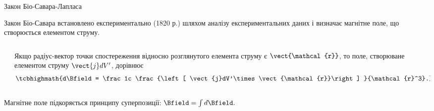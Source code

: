 \documentclass{beamer}
\begin{document}
\begin{frame}{Закон Біо-Савара-Лапласа}{}
	\begin{block}{}\justifying
		Закон Біо-Савара встановлено експериментально (1820 р.) шляхом аналізу експериментальних даних і \alert{визначає магнітне поле, що створюється
			елементом струму}.
	\end{block}
	\begin{columns}
		\begin{column}{0.4\linewidth}\centering
			
		\end{column}
		\begin{column}{0.6\linewidth}
			\begin{block}{}\justifying
				Якщо радіус-вектор точки спостереження відносно розглянутого елемента струму є $\vect{\mathcal{r}}$, то поле,
				створюване елементом струму $\vect{j} dV'$, дорівнює
				\begin{equation*}
					\tcbhighmath{d\Bfield = \frac1c \frac{\left[ \vect{j}dV'\times\vect{\mathcal{r}}\right] }{\mathcal{r}^3}.}
				\end{equation*}
			\end{block}
		\end{column}
	\end{columns}
	\begin{alertblock}{}
		Магнітне поле підкоряється принципу суперпозиції:
		\(
		\Bfield = \int d\Bfield.
		\)
	\end{alertblock}
\end{frame}
\end{document}
